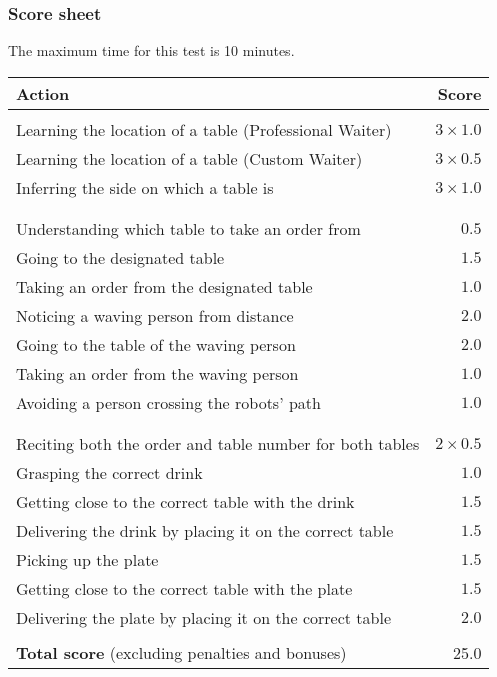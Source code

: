 

\subsubsection{Score sheet}
The maximum time for this test is 10 minutes.

\begin{tabularx}{\textwidth}{ X r }
	\textbf{Action} & \textbf{Score} \\ \hline
	\textbi{Training phase}  \\
	Learning the location of a table (Professional Waiter) & $3 \times 1.0$ \\
	Learning the location of a table (Custom Waiter) & $3 \times 0.5$ \\
	Inferring the side on which a table is & $3 \times 1.0$ \\
	\\
	\textbi{Ordering phase}  \\
	Understanding which table to take an order from & $0.5$ \\
	Going to the designated table & $1.5$ \\
	Taking an order from the designated table & $1.0$ \\
	Noticing a waving person from distance & $2.0$ \\
	Going to the table of the waving person & $2.0$ \\
	Taking an order from the waving person & $1.0$ \\
	Avoiding a person crossing the robots' path & $1.0$ \\
	\\
	\textbi{Delivering phase}  \\
	Reciting both the order and table number for both tables & $2 \times 0.5$ \\
	Grasping the correct drink & $1.0$ \\
	Getting close to the correct table with the drink & $1.5$ \\
	Delivering the drink by placing it on the correct table & $1.5$ \\
	Picking up the plate & $1.5$ \\
	Getting close to the correct table with the plate & $1.5$ \\
	Delivering the plate by placing it on the correct table & $2.0$ \\
	\\ \hline
	\textbf{Total score} (excluding penalties and bonuses) & 25.0 \\
\end{tabularx}